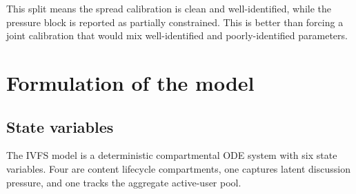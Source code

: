 \documentclass[11pt]{article}
\begin{document}
This split means the spread calibration is clean and well-identified, while the pressure block is reported as partially constrained. This is better than forcing a joint calibration that would mix well-identified and poorly-identified parameters.

\newpage
\section{Formulation of the model}
\label{sec:formulation}

\subsection{State variables}
\label{sec:states}

The IVFS model is a deterministic compartmental ODE system with six state variables. Four are content lifecycle compartments, one captures latent discussion pressure, and one tracks the aggregate active-user pool.
\end{document}
